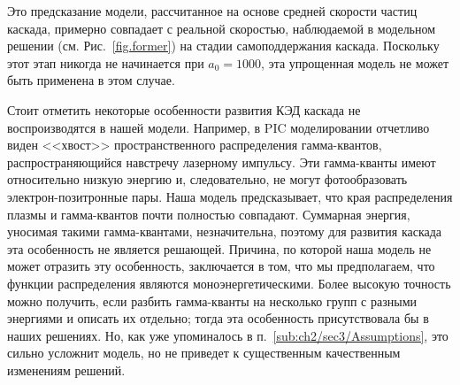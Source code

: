 Это предсказание модели, рассчитанное на основе средней скорости частиц каскада, примерно совпадает с реальной скоростью, наблюдаемой в модельном решении (см. Рис.~\ref{fig.former}) на стадии самоподдержания каскада.
Поскольку этот этап никогда не начинается при $a_0 = 1000$, эта упрощенная модель не может быть применена в этом случае.


Стоит отметить некоторые особенности развития КЭД каскада не воспроизводятся в нашей модели.
Например, в PIC моделировании отчетливо виден <<хвост>> пространственного распределения гамма-квантов, распространяющийся навстречу лазерному импульсу.
Эти гамма-кванты имеют относительно низкую энергию и, следовательно, не могут фотообразовать электрон-позитронные пары.
Наша модель предсказывает, что края распределения плазмы и гамма-квантов почти полностью совпадают.
Суммарная энергия, уносимая такими гамма-квантами, незначительна, поэтому для развития каскада эта особенность не является решающей.
Причина, по которой наша модель не может отразить эту особенность, заключается в том, что мы предполагаем, что функции распределения являются моноэнергетическими.
Более высокую точность можно получить, если разбить гамма-кванты на несколько групп с разными энергиями и описать их отдельно; тогда эта особенность присутствовала бы в наших решениях.
Но, как уже упоминалось в п.~\ref{sub:ch2/sec3/Assumptions}, это сильно усложнит модель, но не приведет к существенным качественным изменениям решений.

